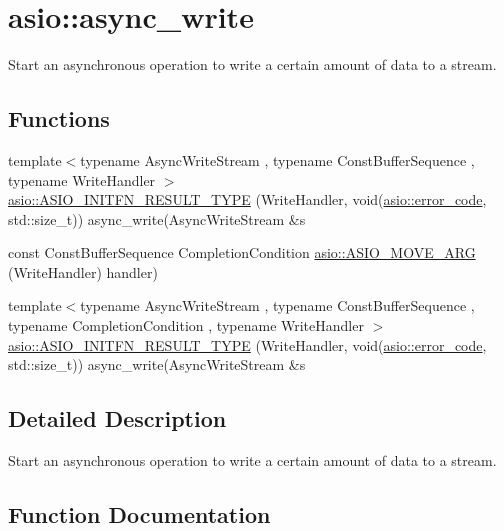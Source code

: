 \hypertarget{group__async__write}{}\section{asio\+:\+:async\+\_\+write}
\label{group__async__write}


Start an asynchronous operation to write a certain amount of data to a stream.  


\subsection*{Functions}
\begin{DoxyCompactItemize}
\item 
{\footnotesize template$<$typename Async\+Write\+Stream , typename Const\+Buffer\+Sequence , typename Write\+Handler $>$ }\\\hyperlink{group__async__write_ga7b61e40209cec169c7de5fafc16a6f9c}{asio\+::\+A\+S\+I\+O\+\_\+\+I\+N\+I\+T\+F\+N\+\_\+\+R\+E\+S\+U\+L\+T\+\_\+\+T\+Y\+P\+E} (Write\+Handler, void(\hyperlink{classasio_1_1error__code}{asio\+::error\+\_\+code}, std\+::size\+\_\+t)) async\+\_\+write(Async\+Write\+Stream \&s
\item 
const Const\+Buffer\+Sequence Completion\+Condition \hyperlink{group__async__write_ga9600cc9bb72a930568b318a8d6f79afa}{asio\+::\+A\+S\+I\+O\+\_\+\+M\+O\+V\+E\+\_\+\+A\+R\+G} (Write\+Handler) handler)
\item 
{\footnotesize template$<$typename Async\+Write\+Stream , typename Const\+Buffer\+Sequence , typename Completion\+Condition , typename Write\+Handler $>$ }\\\hyperlink{group__async__write_ga5a1e5b963aeb45f6fc692c4e1a07ed04}{asio\+::\+A\+S\+I\+O\+\_\+\+I\+N\+I\+T\+F\+N\+\_\+\+R\+E\+S\+U\+L\+T\+\_\+\+T\+Y\+P\+E} (Write\+Handler, void(\hyperlink{classasio_1_1error__code}{asio\+::error\+\_\+code}, std\+::size\+\_\+t)) async\+\_\+write(Async\+Write\+Stream \&s
\end{DoxyCompactItemize}


\subsection{Detailed Description}
Start an asynchronous operation to write a certain amount of data to a stream. 



\subsection{Function Documentation}
\hypertarget{group__async__write_ga5a1e5b963aeb45f6fc692c4e1a07ed04}{}
